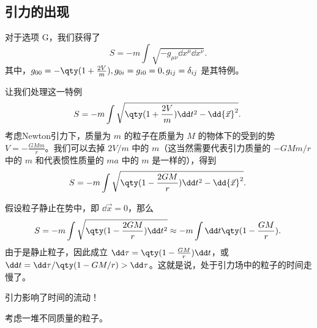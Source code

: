 \subsection{引力的出现}
对于选项 G，我们获得了
\begin{equation}
S=-m\int\sqrt{-g_{\mu\nu}\dd x^\mu\dd x^\nu}.~
\end{equation}
其中，$g_{00}=-\qty(1+\frac{2V}{m}),g_{0i}=g_{i0}=0,g_{ij}=\delta_{ij}$ 是其特例。

让我们处理这一特例
\begin{equation}
S=-m\int\sqrt{\qty(1+\frac{2V}{m})\dd t^2-\dd {\vec x}^2}.~
\end{equation}
考虑Newton引力下，质量为 $m$ 的粒子在质量为 $M$ 的物体下的受到的势 $V=-\frac{GMm}{r}$。我们可以去掉 $2V/m$ 中的 $m$（这当然需要代表引力质量的 $-GMm/r$ 中的 $m$ 和代表惯性质量的 $ma$ 中的 $m$ 是一样的），得到
\begin{equation}
S=-m\int\sqrt{\qty(1-\frac{2GM}{r})\dd t^2-\dd {\vec x}^2}.~
\end{equation}

假设粒子静止在势中，即 $\dd {\vec x}=0$，那么
\begin{equation}
S=-m\int\sqrt{\qty(1-\frac{2GM}{r})\dd t^2}\approx-m\int\dd t\qty(1-\frac{GM}{r}).~
\end{equation}
由于是静止粒子，因此成立 $\dd\tau=\qty(1-\frac{GM}{r})\dd t$，或 $\dd t=\dd \tau/\qty(1-GM/r)>\dd\tau$。这就是说，处于引力场中的粒子的时间走慢了。

引力影响了时间的流动！

考虑一堆不同质量的粒子。









